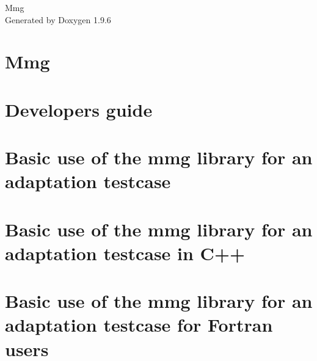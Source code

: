 \documentclass[twoside]{book}
\newcommand{\+}{\discretionary{\mbox{\scriptsize$\hookleftarrow$}}{}{}}
\newcommand{\clearemptydoublepage}{%
    \newpage{\pagestyle{empty}\cleardoublepage}%
  }
\begin{document}
  \raggedbottom
    \hypersetup{pageanchor=false,
                bookmarksnumbered=true,
                pdfencoding=unicode
               }
  \begin{titlepage}
  \vspace*{7cm}
  \begin{center}%
  {\Large Mmg}\\
  \vspace*{1cm}
  {\large Generated by Doxygen 1.9.6}\\
  \end{center}
  \end{titlepage}
  \clearemptydoublepage
  \tableofcontents
  \clearemptydoublepage
  \hypersetup{pageanchor=true}
\chapter{Mmg}
\label{index}\hypertarget{index}{}
\chapter{Developers guide}
\label{md_CONTRIBUTING}

\chapter{Basic use of the mmg library for an adaptation testcase}
\label{md_libexamples_mmg_adaptation_example0_README}

\chapter{Basic use of the mmg library for an adaptation testcase in C++}
\label{md_libexamples_mmg_adaptation_example0_cpp_README}

\chapter{Basic use of the mmg library for an adaptation testcase for Fortran users}
\label{md_libexamples_mmg_adaptation_example0_fortran_README}

\end{document}
